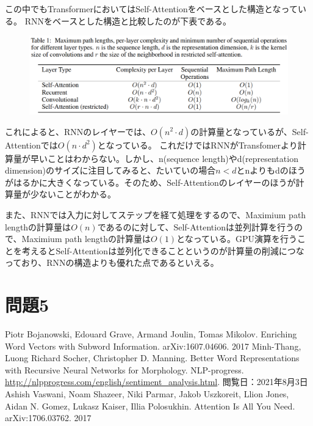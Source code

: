 \documentclass[a4j,11pt]{jarticle}
\begin{document}
この中でもTransformerにおいてはSelf-Attentionをベースとした構造となっている。
RNNをベースとした構造と比較したのが下表である。

\begin{figure}[hbtp]
    \centering
    \includegraphics[width=12cm]{p4-1.png}
\end{figure}

これによると、RNNのレイヤーでは、$O(n^2\cdot d)$の計算量となっているが、Self-Attentionでは$O(n \cdot d^2)$となっている。
これだけではRNNがTransfomerより計算量が早いことはわからない。しかし、n(sequence length)やd(representation dimension)のサイズに注目してみると、たいていの場合$n < d$とnよりもdのほうがはるかに大きくなっている。そのため、Self-Attentionのレイヤーのほうが計算量が少ないことがわかる。

また、RNNでは入力に対してステップを経て処理をするので、Maximium path lengthの計算量は$O(n)$であるのに対して、Self-Attentionは並列計算を行うので、Maximium path lengthの計算量は$O(1)$となっている。GPU演算を行うことを考えるとSelf-Attentionは並列化できることというのが計算量の削減につなっており、RNNの構造よりも優れた点であるといえる。




\newpage
\section{問題5}


\begin{thebibliography}{99}
     Piotr Bojanowski, Edouard Grave, Armand Joulin, Tomas Mikolov. Enriching Word Vectors with Subword Information. arXiv:1607.04606. 2017
     Minh-Thang, Luong Richard Socher, Christopher D. Manning. Better Word Representations with Recursive Neural Networks for Morphology.
     NLP-progress. \url{http://nlpprogress.com/english/sentiment_analysis.html}. 閲覧日：2021年8月3日
     Ashish Vaswani, Noam Shazeer, Niki Parmar, Jakob Uszkoreit, Llion Jones, Aidan N. Gomez, Lukasz Kaiser, Illia Polosukhin. Attention Is All You Need. arXiv:1706.03762. 2017
    \bibitem{}
    \bibitem{}
    \bibitem{}
    \bibitem{}
    \bibitem{}
    \bibitem{}
    \bibitem{}

\end{thebibliography}
\end{document}
